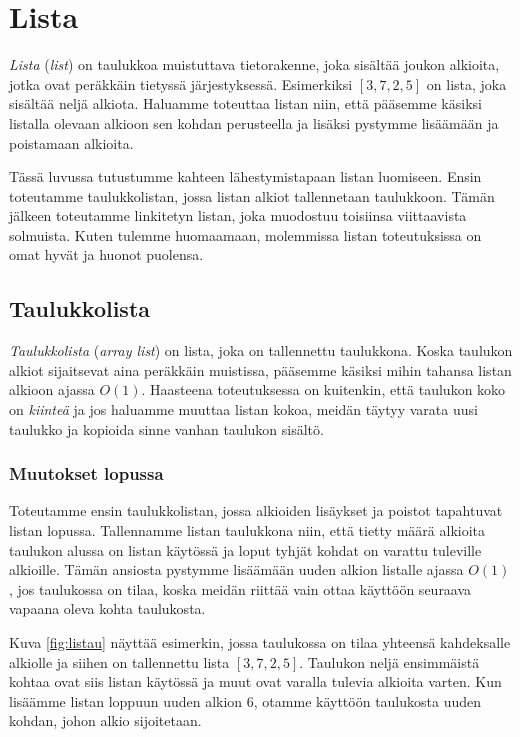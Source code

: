 \chapter{Lista}


\emph{Lista} (\emph{list}) on taulukkoa muistuttava tietorakenne,
joka sisältää joukon alkioita,
jotka ovat peräkkäin tietyssä järjestyksessä.
Esimerkiksi $[3,7,2,5]$ on lista, joka sisältää neljä alkiota.
Haluamme toteuttaa listan niin,
että pääsemme käsiksi listalla olevaan alkioon
sen kohdan perusteella
ja lisäksi pystymme lisäämään ja poistamaan alkioita.

Tässä luvussa tutustumme kahteen lähestymistapaan listan luomiseen.
Ensin toteutamme taulukkolistan,
jossa listan alkiot tallennetaan taulukkoon.
Tämän jälkeen toteutamme linkitetyn listan,
joka muodostuu toisiinsa viittaavista solmuista.
Kuten tulemme huomaamaan, molemmissa listan toteutuksissa on omat
hyvät ja huonot puolensa.

\section{Taulukkolista}


\emph{Taulukkolista} (\emph{array list}) on lista, joka on tallennettu taulukkona.
Koska taulukon alkiot sijaitsevat aina peräkkäin muistissa,
pääsemme käsiksi mihin tahansa listan alkioon ajassa $O(1)$.
Haasteena toteutuksessa on kuitenkin,
että taulukon koko on \emph{kiinteä} ja jos haluamme
muuttaa listan kokoa, meidän täytyy varata uusi taulukko
ja kopioida sinne vanhan taulukon sisältö.

\subsection{Muutokset lopussa}

Toteutamme ensin taulukkolistan, jossa alkioiden
lisäykset ja poistot tapahtuvat listan lopussa.
Tallennamme listan taulukkona niin,
että tietty määrä alkioita taulukon alussa on listan käytössä
ja loput tyhjät kohdat on varattu tuleville alkioille.
Tämän ansiosta pystymme lisäämään uuden alkion listalle
ajassa $O(1)$, jos taulukossa on tilaa,
koska meidän riittää vain ottaa käyttöön seuraava
vapaana oleva kohta taulukosta.

Kuva \ref{fig:listau} näyttää esimerkin,
jossa taulukossa on tilaa yhteensä kahdeksalle alkiolle
ja siihen on tallennettu lista $[3,7,2,5]$.
Taulukon neljä ensimmäistä kohtaa ovat siis listan käytössä
ja muut ovat varalla tulevia alkioita varten.
Kun lisäämme listan loppuun uuden alkion 6,
otamme käyttöön taulukosta uuden kohdan, johon alkio sijoitetaan.

